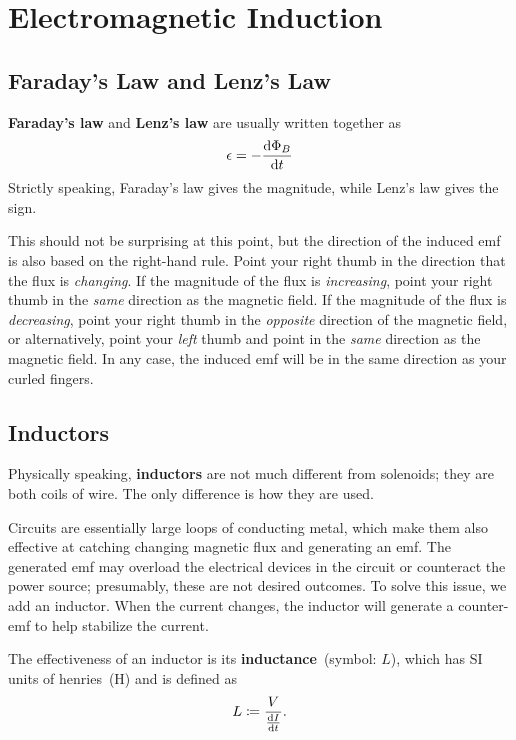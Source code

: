 \chapter{Electromagnetic Induction}

\section{Faraday's Law and Lenz's Law}

\textbf{Faraday's law} and \textbf{Lenz's law} are usually written together as
\begin{equation} \label{eq:faraday-lenz-law}
    \epsilon = - \odv{\Phi_B}{t}
\end{equation}
Strictly speaking, Faraday's law gives the magnitude,
while Lenz's law gives the sign.

This should not be surprising at this point,
but the direction of the induced emf is also based on the right-hand rule.
Point your right thumb in the direction that the flux is \emph{changing}.
If the magnitude of the flux is \emph{increasing},
point your right thumb in the \emph{same} direction as the magnetic field.
If the magnitude of the flux is \emph{decreasing},
point your right thumb in the \emph{opposite} direction of the magnetic field,
or alternatively, point your \emph{left} thumb
and point in the \emph{same} direction as the magnetic field.
In any case,
the induced emf will be in the same direction as your curled fingers.

\section{Inductors}

Physically speaking, \textbf{inductors} are not much different from solenoids;
they are both coils of wire.
The only difference is how they are used.

Circuits are essentially large loops of conducting metal,
which make them also effective at catching changing magnetic flux and
generating an emf.
The generated emf may overload the electrical devices in the circuit
or counteract the power source;
presumably, these are not desired outcomes.
To solve this issue, we add an inductor.
When the current changes,
the inductor will generate a counter-emf to help stabilize the current.

The effectiveness of an inductor is its \textbf{inductance}~(symbol: \(L\)),
which has SI units of henries~(\unit{\henry}) and is defined as
\begin{equation}
    L \coloneq \frac{V}{\odv{I}{t}}.
\end{equation}

